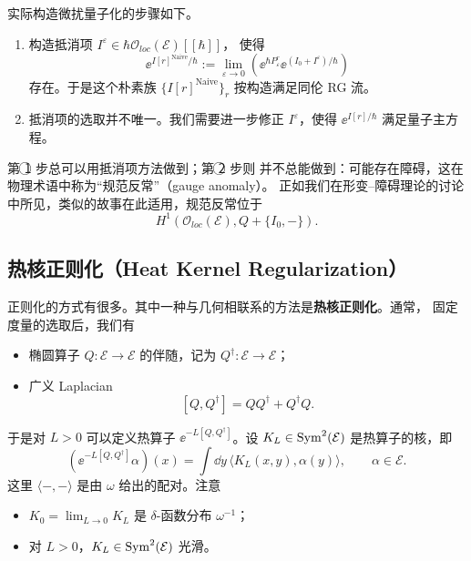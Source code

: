实际构造微扰量子化的步骤如下。
\begin{enumerate}[label=\textcircled{\small\arabic*},leftmargin=2.4em,itemsep=0.3em]
  \item 构造抵消项 $I^{\varepsilon}\in\hbar\mathcal{O}_{loc}(\mathcal{E})[[\hbar]]$，
        使得
        \[
          \ee^{I[r]^{\mathrm{Naive}}/\hbar}
          :=\lim_{\varepsilon\to0}
          \left(\ee^{\hbar P^r_{\varepsilon}}\ee^{(I_0+I^{\varepsilon})/\hbar}\right)
        \]
        存在。于是这个朴素族 $\{I[r]^{\mathrm{Naive}}\}_r$ 按构造满足同伦 RG 流。
  \item 抵消项的选取并不唯一。我们需要进一步修正 $I^{\varepsilon}$，使得
        $\ee^{I[r]/\hbar}$ 满足量子主方程。
\end{enumerate}
第 \textcircled{\small 1} 步总可以用抵消项方法做到；第 \textcircled{\small 2} 步则
并不总能做到：可能存在障碍，这在物理术语中称为“规范反常”（gauge anomaly）。
正如我们在形变–障碍理论的讨论中所见，类似的故事在此适用，规范反常位于
\[
  H^1(\mathcal{O}_{loc}(\mathcal{E}),Q+\{I_0,-\}).
\]



\subsection{热核正则化（Heat Kernel Regularization）}

正则化的方式有很多。其中一种与几何相联系的方法是\textbf{热核正则化}。通常，
固定度量的选取后，我们有
\begin{itemize}[leftmargin=1.6em,itemsep=0.2em]
  \item 椭圆算子 $Q:\mathcal{E}\to\mathcal{E}$ 的伴随，记为
        $Q^{\dagger}:\mathcal{E}\to\mathcal{E}$；
  \item 广义 Laplacian
        \[
          [Q,Q^{\dagger}]=QQ^{\dagger}+Q^{\dagger}Q.
        \]
\end{itemize}
于是对 $L>0$ 可以定义热算子 $\ee^{-L[Q,Q^{\dagger}]}$。设
$K_L\in\operatorname{Sym}^2(\mathcal{E})$ 是热算子的核，即
\[
  \left(\ee^{-L[Q,Q^{\dagger}]}\alpha\right)(x)
  =\int \dd y\,\langle K_L(x,y),\alpha(y)\rangle,
  \qquad \alpha\in\mathcal{E}.
\]
这里 $\langle-,-\rangle$ 是由 $\omega$ 给出的配对。注意
\begin{itemize}[leftmargin=1.6em,itemsep=0.2em]
  \item $K_0=\lim_{L\to0}K_L$ 是 $\delta$-函数分布 $\omega^{-1}$；
  \item 对 $L>0$，$K_L\in\operatorname{Sym}^2(\mathcal{E})$ 光滑。
\end{itemize}

